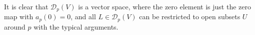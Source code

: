 \begin{remark} \label{RemDerivationsatapointarelocally}
\leavevmode\newline
It is clear that $\mathcal{D}_p(V)$ is a vector space, where the zero element is just the zero map with $a_p(0) = 0$, and all $L \in \mathcal{D}_p(V)$ can be restricted to open subsets $U$ around $p$ with the typical arguments.
%

\end{remark}
